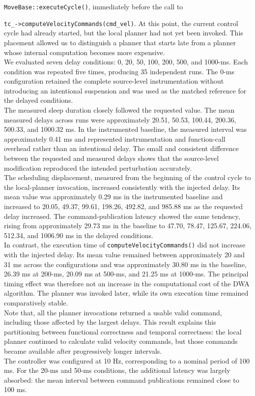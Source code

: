 \noindent \texttt{MoveBase::executeCycle()}, immediately before the call to 

\noindent \texttt{tc\_->computeVelocityCommands(cmd\_vel)}. At this point, the current control cycle had already started, but the local planner had not yet been invoked. This placement allowed us to distinguish a planner that starts late from a planner whose internal computation becomes more expensive.
\\
We evaluated seven delay conditions: 0, 20, 50, 100, 200, 500, and 1000-ms. Each condition was repeated five times, producing 35 independent runs. The 0-ms configuration retained the complete source-level instrumentation without introducing an intentional suspension and was used as the matched reference for the delayed conditions.
\\
The measured sleep duration closely followed the requested value. The mean measured delays across runs were approximately 20.51, 50.53, 100.44, 200.36, 500.33, and 1000.32 ms. In the instrumented baseline, the measured interval was approximately 0.41 ms and represented instrumentation and function-call overhead rather than an intentional delay. The small and consistent difference between the requested and measured delays shows that the source-level modification reproduced the intended perturbation accurately.
\\
The scheduling displacement, measured from the beginning of the control cycle to the local-planner invocation, increased consistently with the injected delay. Its mean value was approximately 0.29 ms in the instrumented baseline and increased to 20.05, 49.37, 99.61, 198.26, 492.82, and 985.88 ms as the requested delay increased. The command-publication latency showed the same tendency, rising from approximately 29.73 ms in the baseline to 47.70, 78.47, 125.67, 224.06, 512.34, and 1006.90 ms in the delayed conditions.
\\
In contrast, the execution time of \texttt{computeVelocityCommands()} did not increase with the injected delay. Its mean value remained between approximately 20 and 31 ms across the configurations and was approximately 30.80 ms in the baseline, 26.39 ms at 200-ms, 20.09 ms at 500-ms, and 21.25 ms at 1000-ms. The principal timing effect was therefore not an increase in the computational cost of the DWA algorithm. The planner was invoked later, while its own execution time remained comparatively stable.
\\
Note that, all the planner invocations returned a usable valid command, including those affected by the largest delays. This result explains this partitioning between functional correctness and temporal correctness: the local planner continued to calculate valid velocity commands, but those commands became available after progressively longer intervals.
\\
The controller was configured at 10 Hz, corresponding to a nominal period of 100 ms. For the 20-ms and 50-ms conditions, the additional latency was largely absorbed: the mean interval between command publications remained close to 100 ms. 

